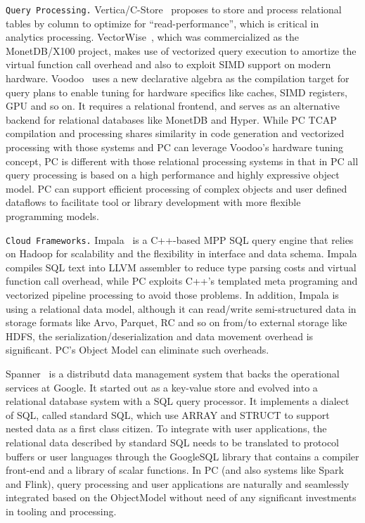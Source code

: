 \vspace{5pt} 
\texttt{Query Processing.} Vertica/C-Store~\cite{stonebraker2005c} proposes
to store and process relational tables by
column to optimize for ``read-performance'', which is critical in
analytics processing.
VectorWise~\cite{zukowski2012vectorwise}, which was commercialized as the MonetDB/X100 project, makes use of
vectorized query execution to amortize the virtual function call overhead and also to exploit SIMD support
on modern hardware. Voodoo~\cite{pirk2016voodoo} uses a new
declarative algebra as the compilation target for query plans to
enable tuning for hardware specifics like caches, SIMD registers,
GPU and so on. It requires a relational frontend, and serves as an alternative backend for
relational databases like MonetDB and Hyper. While PC TCAP compilation
and processing shares
similarity in
code generation and vectorized processing with those
systems and PC can leverage Voodoo's hardware tuning concept, PC is
different with those relational processing systems in that in PC all query processing
is based on a high performance and highly expressive object model.
PC can support efficient
processing of complex objects and user defined
dataflows to facilitate tool or library development with more flexible
programming models.

\vspace{5pt} 
\texttt{Cloud Frameworks.} Impala~\cite{bittorf2015impala} is a
C++-based MPP
SQL query engine that relies on Hadoop for scalability and the
flexibility in interface and data schema. Impala compiles SQL text
into LLVM assembler to reduce type parsing costs and virtual function
call overhead, while PC exploits C++'s templated meta programing and
vectorized pipeline processing to avoid those problems. In addition,
Impala is using a relational data model, although it can read/write
semi-structured data in storage formats like Arvo, Parquet, RC and so
on from/to external storage like HDFS, the
serialization/deserialization and data movement overhead is
significant. PC's Object Model can eliminate such overheads.

Spanner~\cite{bacon2017spanner} is a
distributd data management system that backs the operational services
at Google. It started out as a key-value store and evolved into a
relational database system with a SQL query processor. It implements a
dialect of SQL, called standard SQL, which use ARRAY and STRUCT to
support nested data as a first class citizen. To integrate
with user applications, the relational data described by standard SQL needs to
be translated to protocol buffers or user languages through the
GoogleSQL library that contains a compiler front-end and a library of
scalar functions. In PC (and also systems like Spark and Flink), query processing and user applications are
naturally and
seamlessly integrated based on the ObjectModel without need of any
significant investments in tooling and processing.

